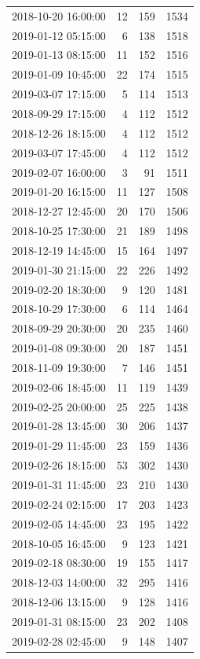 \begin{tabular}{lrrr}
2018-10-20 16:00:00 & 12 & 159 & 1534 \\
2019-01-12 05:15:00 & 6 & 138 & 1518 \\
2019-01-13 08:15:00 & 11 & 152 & 1516 \\
2019-01-09 10:45:00 & 22 & 174 & 1515 \\
2019-03-07 17:15:00 & 5 & 114 & 1513 \\
2018-09-29 17:15:00 & 4 & 112 & 1512 \\
2018-12-26 18:15:00 & 4 & 112 & 1512 \\
2019-03-07 17:45:00 & 4 & 112 & 1512 \\
2019-02-07 16:00:00 & 3 & 91 & 1511 \\
2019-01-20 16:15:00 & 11 & 127 & 1508 \\
2018-12-27 12:45:00 & 20 & 170 & 1506 \\
2018-10-25 17:30:00 & 21 & 189 & 1498 \\
2018-12-19 14:45:00 & 15 & 164 & 1497 \\
2019-01-30 21:15:00 & 22 & 226 & 1492 \\
2019-02-20 18:30:00 & 9 & 120 & 1481 \\
2018-10-29 17:30:00 & 6 & 114 & 1464 \\
2018-09-29 20:30:00 & 20 & 235 & 1460 \\
2019-01-08 09:30:00 & 20 & 187 & 1451 \\
2018-11-09 19:30:00 & 7 & 146 & 1451 \\
2019-02-06 18:45:00 & 11 & 119 & 1439 \\
2019-02-25 20:00:00 & 25 & 225 & 1438 \\
2019-01-28 13:45:00 & 30 & 206 & 1437 \\
2019-01-29 11:45:00 & 23 & 159 & 1436 \\
2019-02-26 18:15:00 & 53 & 302 & 1430 \\
2019-01-31 11:45:00 & 23 & 210 & 1430 \\
2019-02-24 02:15:00 & 17 & 203 & 1423 \\
2019-02-05 14:45:00 & 23 & 195 & 1422 \\
2018-10-05 16:45:00 & 9 & 123 & 1421 \\
2019-02-18 08:30:00 & 19 & 155 & 1417 \\
2018-12-03 14:00:00 & 32 & 295 & 1416 \\
2018-12-06 13:15:00 & 9 & 128 & 1416 \\
2019-01-31 08:15:00 & 23 & 202 & 1408 \\
2019-02-28 02:45:00 & 9 & 148 & 1407 \\

\end{tabular}

